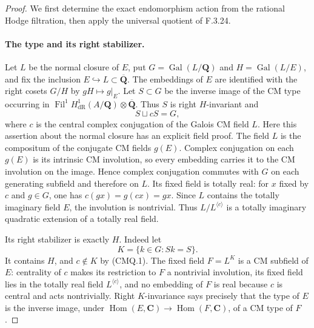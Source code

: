 \begin{proof}
We first determine the exact endomorphism action from the rational
Hodge filtration, then apply the universal quotient of F.3.24.

\paragraph{The type and its right stabilizer.}
Let $L$ be the normal closure of $E$, put
$G=\operatorname{Gal}(L/\mathbf Q)$ and
$H=\operatorname{Gal}(L/E)$, and fix the inclusion
$E\hookrightarrow L\subset\overline{\mathbf Q}$.
The embeddings of $E$ are identified with the right
cosets $G/H$ by $gH\mapsto g|_E$. Let $S\subset G$
be the inverse image of the CM type occurring in
$\operatorname{Fil}^1H^1_{\mathrm{dR}}(A/\mathbf Q)
\otimes\overline{\mathbf Q}$. Thus $S$ is right
$H$-invariant and
\[
                           S\sqcup cS=G,                  \tag{CMQ.1}
\]
where $c$ is the central complex conjugation of the
Galois CM field $L$. Here this assertion about the normal
closure has an explicit field proof. The field $L$ is
the compositum of the conjugate CM fields $g(E)$.
Complex conjugation on each $g(E)$ is its intrinsic
CM involution, so every embedding carries it to the
CM involution on the image. Hence complex conjugation
commutes with $G$ on each generating subfield and
therefore on $L$. Its fixed field is totally real:
for $x$ fixed by $c$ and $g\in G$, one has
$c(gx)=g(cx)=gx$. Since $L$ contains the totally
imaginary field $E$, the involution is nontrivial.
Thus $L/L^{\langle c\rangle}$ is a totally
imaginary quadratic extension of a totally real field.

Its right stabilizer is exactly $H$. Indeed let
\[
                    K=\{k\in G:Sk=S\}.
\]
It contains $H$, and $c\notin K$ by (CMQ.1).
The fixed field $F=L^K$ is a CM subfield of $E$:
centrality of $c$ makes its restriction to $F$ a
nontrivial involution, its fixed field lies in the
totally real field $L^{\langle c\rangle}$, and no
embedding of $F$ is real because $c$ is central and
acts nontrivially. Right $K$-invariance says precisely
that the type of $E$ is the inverse image, under
$\operatorname{Hom}(E,\mathbf C)\to
 \operatorname{Hom}(F,\mathbf C)$, of a CM type of $F$.


\end{proof}
